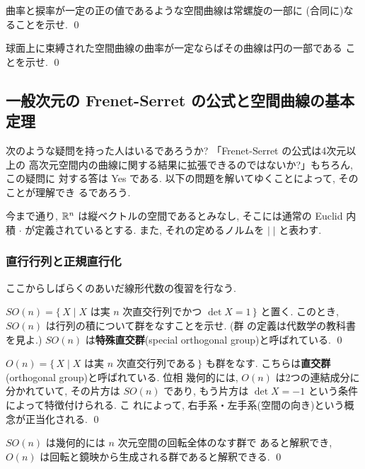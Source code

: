 \documentclass[12pt,twoside]{jarticle}
\begin{document}
\begin{question}[常螺旋]
 曲率と捩率が一定の正の値であるような空間曲線は常螺旋の一部に
 (合同に)なることを示せ.
 \qed
\end{question}

\begin{question}[球面上の円]
 球面上に束縛された空間曲線の曲率が一定ならばその曲線は円の一部である
 ことを示せ. 
 \qed
\end{question}

\subsection{一般次元の Frenet-Serret の公式と空間曲線の基本定理}

次のような疑問を持った人はいるであろうか? 「Frenet-Serret の公式は4次元以上の
高次元空間内の曲線に関する結果に拡張できるのではないか?」もちろん, この疑問に
対する答は Yes である. 以下の問題を解いてゆくことによって, そのことが理解でき
るであろう.

今まで通り, ${\mathbb R}^n$ は縦ベクトルの空間であるとみなし, そこには通常の Euclid 内
積 $\cdot$ が定義されているとする. また, それの定めるノルムを $|\;|$ と表わす.

\subsubsection{直行行列と正規直行化}

ここからしばらくのあいだ線形代数の復習を行なう.

\begin{question}[特殊直行群]
  \(
    SO(n)
    =
    \{\, X \mid \text{$X$ は実 $n$ 次直交行列でかつ $\det X = 1$} \,\}
  \) %
  と置く. このとき, $SO(n)$ は行列の積について群をなすことを示せ. (群
  の定義は代数学の教科書を見よ.) $SO(n)$ は{\bf 特殊直交群}(special
  orthogonal group)と呼ばれている. \qed
\end{question}

\begin{guide}
\(
  O(n)
  =
  \{\, X \mid \text{$X$ は実 $n$ 次直交行列である} \,\}
\) %
も群をなす. こちらは{\bf 直交群}(orthogonal group)と呼ばれている. 位相
幾何的には, $O(n)$ は2つの連結成分に分かれていて, その片方は $SO(n)$ 
であり, もう片方は $\det X = - 1$ という条件によって特徴付けられる. こ
れによって, 右手系・左手系(空間の向き)という概念が正当化される. 
\qed 
\end{guide}

\begin{guide}
$SO(n)$ は幾何的には $n$ 次元空間の回転全体のなす群で
あると解釈でき, $O(n)$ は回転と鏡映から生成される群であると解釈できる.
\qed 
\end{guide}
\end{document}
